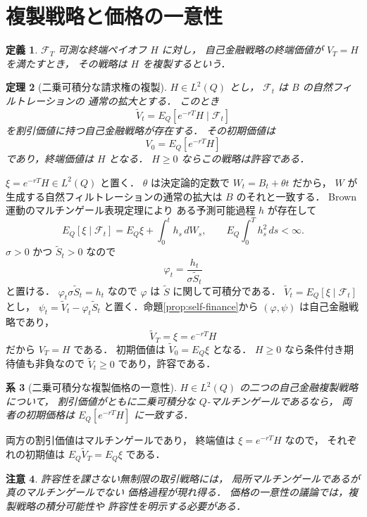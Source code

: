 \documentclass[a5paper,10pt,onecolumn]{jsarticle}
\makeatletter
\theoremstyle{mathnotetheorem}
\newtheorem{theorem}{定理}[section]
\newtheorem{definition}[theorem]{定義}
\newtheorem{corollary}[theorem]{系}
\newtheorem{remark}[theorem]{注意}
\renewcommand{\proofname}{証明}
\renewenvironment{proof}[1][\proofname]{%
  \par\pushQED{\qed}\normalfont\topsep4\p@\@plus2\p@\relax
  \trivlist\item[\hskip\labelsep\bfseries #1]\ignorespaces
}{\popQED\endtrivlist\@endpefalse}
\makeatother
\begin{document}
\section{複製戦略と価格の一意性}

\begin{definition}
$\mathcal F_T$ 可測な終端ペイオフ $H$ に対し，
自己金融戦略の終端価値が $V_T=H$ を満たすとき，
その戦略は $H$ を\emph{複製する}という．
\end{definition}

\begin{theorem}[二乗可積分な請求権の複製]\label{thm:complete}
$H\in L^2(Q)$ とし，
$\mathcal F_t$ は $B$ の自然フィルトレーションの
通常の拡大とする．
このとき
\[
 \widetilde V_t
 =E_Q[e^{-rT}H\mid\mathcal F_t]
\]
を割引価値に持つ自己金融戦略が存在する．
その初期価値は
\[
 V_0=E_Q[e^{-rT}H]
\]
であり，終端価値は $H$ となる．
$H\ge0$ ならこの戦略は許容である．
\end{theorem}
\begin{proof}
$\xi=e^{-rT}H\in L^2(Q)$ と置く．
$\theta$ は決定論的定数で
$W_t=B_t+\theta t$ だから，
$W$ が生成する自然フィルトレーションの通常の拡大は
$B$ のそれと一致する．
Brown運動のマルチンゲール表現定理により
ある予測可能過程 $h$ が存在して
\[
 E_Q[\xi\mid\mathcal F_t]
 =E_Q\xi+\int_0^th_s\,dW_s,\qquad
 E_Q\int_0^Th_s^2\,ds<\infty.
\]
$\sigma>0$ かつ $\widetilde S_t>0$ なので
\[
 \varphi_t=\frac{h_t}{\sigma\widetilde S_t}
\]
と置ける．
$\varphi_t\sigma\widetilde S_t=h_t$ なので
$\varphi$ は $\widetilde S$ に関して可積分である．
$\widetilde V_t=E_Q[\xi\mid\mathcal F_t]$ とし，
$\psi_t=\widetilde V_t-\varphi_t\widetilde S_t$
と置く．命題\ref{prop:self-finance}から
$(\varphi,\psi)$ は自己金融戦略であり，
\[
 \widetilde V_T=\xi=e^{-rT}H
\]
だから $V_T=H$ である．
初期価値は $\widetilde V_0=E_Q\xi$ となる．
$H\ge0$ なら条件付き期待値も非負なので
$\widetilde V_t\ge0$ であり，許容である．
\end{proof}

\begin{corollary}[二乗可積分な複製価格の一意性]
$H\in L^2(Q)$ の二つの自己金融複製戦略について，
割引価値がともに二乗可積分な
$Q$-マルチンゲールであるなら，
両者の初期価格は
$E_Q[e^{-rT}H]$ に一致する．
\end{corollary}
\begin{proof}
両方の割引価値はマルチンゲールであり，
終端値は $\xi=e^{-rT}H$ なので，
それぞれの初期値は
$E_Q\widetilde V_T=E_Q\xi$ である．
\end{proof}

\begin{remark}
許容性を課さない無制限の取引戦略には，
局所マルチンゲールであるが真のマルチンゲールでない
価格過程が現れ得る．
価格の一意性の議論では，複製戦略の積分可能性や
許容性を明示する必要がある．
\end{remark}
\end{document}
